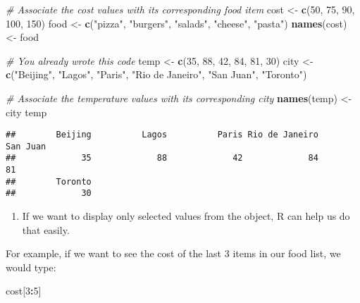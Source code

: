 \documentclass[]{article}
\newenvironment{Shaded}{\begin{snugshade}}{\end{snugshade}}
\newcommand{\CommentTok}[1]{\textcolor[rgb]{0.56,0.35,0.01}{\textit{#1}}}
\newcommand{\DecValTok}[1]{\textcolor[rgb]{0.00,0.00,0.81}{#1}}
\newcommand{\KeywordTok}[1]{\textcolor[rgb]{0.13,0.29,0.53}{\textbf{#1}}}
\newcommand{\NormalTok}[1]{#1}
\newcommand{\OperatorTok}[1]{\textcolor[rgb]{0.81,0.36,0.00}{\textbf{#1}}}
\newcommand{\StringTok}[1]{\textcolor[rgb]{0.31,0.60,0.02}{#1}}
\providecommand{\tightlist}{%
  \setlength{\itemsep}{0pt}\setlength{\parskip}{0pt}}
\begin{document}
\begin{Shaded}
\begin{Highlighting}[]
\CommentTok{# Associate the cost values with its corresponding food item}
\NormalTok{cost <-}\StringTok{ }\KeywordTok{c}\NormalTok{(}\DecValTok{50}\NormalTok{, }\DecValTok{75}\NormalTok{, }\DecValTok{90}\NormalTok{, }\DecValTok{100}\NormalTok{, }\DecValTok{150}\NormalTok{)}
\NormalTok{food <-}\StringTok{ }\KeywordTok{c}\NormalTok{(}\StringTok{"pizza"}\NormalTok{, }\StringTok{"burgers"}\NormalTok{, }\StringTok{"salads"}\NormalTok{, }\StringTok{"cheese"}\NormalTok{, }\StringTok{"pasta"}\NormalTok{)}
\KeywordTok{names}\NormalTok{(cost) <-}\StringTok{ }\NormalTok{food}

\CommentTok{# You already wrote this code}
\NormalTok{temp <-}\StringTok{ }\KeywordTok{c}\NormalTok{(}\DecValTok{35}\NormalTok{, }\DecValTok{88}\NormalTok{, }\DecValTok{42}\NormalTok{, }\DecValTok{84}\NormalTok{, }\DecValTok{81}\NormalTok{, }\DecValTok{30}\NormalTok{)}
\NormalTok{city <-}\StringTok{ }\KeywordTok{c}\NormalTok{(}\StringTok{"Beijing"}\NormalTok{, }\StringTok{"Lagos"}\NormalTok{, }\StringTok{"Paris"}\NormalTok{, }\StringTok{"Rio de Janeiro"}\NormalTok{, }\StringTok{"San Juan"}\NormalTok{, }\StringTok{"Toronto"}\NormalTok{)}

\CommentTok{# Associate the temperature values with its corresponding city}
\KeywordTok{names}\NormalTok{(temp) <-}\StringTok{ }\NormalTok{city}
\NormalTok{temp}
\end{Highlighting}
\end{Shaded}

\begin{verbatim}
##        Beijing          Lagos          Paris Rio de Janeiro       San Juan 
##             35             88             42             84             81 
##        Toronto 
##             30
\end{verbatim}

\begin{enumerate}
\def\labelenumi{\arabic{enumi}.}
\setcounter{enumi}{3}
\tightlist
\item
  If we want to display only selected values from the object, R can help
  us do that easily.
\end{enumerate}

For example, if we want to see the cost of the last 3 items in our food
list, we would type:

\begin{Shaded}
\begin{Highlighting}[]
\NormalTok{cost[}\DecValTok{3}\OperatorTok{:}\DecValTok{5}\NormalTok{]}
\end{Highlighting}
\end{Shaded}
\end{document}

